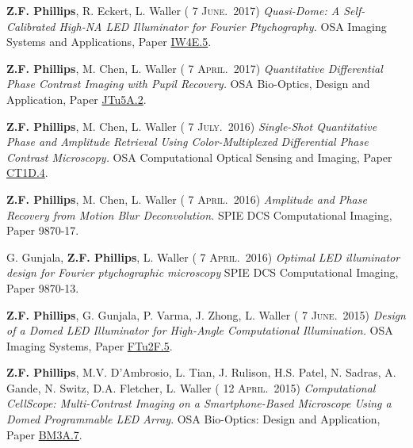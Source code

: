 \documentclass[12pt,letterpaper]{article}
\renewcommand{\date}[1]{{} #1}
\begin{document}
\textbf{Z.F. Phillips}, R. Eckert, L. Waller (\date{7 \textsc{June.}~2017})
\emph{Quasi-Dome: A Self-Calibrated High-NA LED  \linebreak Illuminator for Fourier Ptychography.} OSA Imaging Systems and Applications, Paper \href{https://www.osapublishing.org/abstract.cfm?uri=COSI-2016-CT1D.4}{IW4E.5}.
\medskip

\textbf{Z.F. Phillips}, M. Chen, L. Waller (\date{7 \textsc{April.}~2017})
\emph{Quantitative Differential Phase Contrast Imaging with Pupil Recovery.} OSA Bio-Optics, Design and Application, Paper \href{https://www.osapublishing.org/abstract.cfm?uri=BODA-2017-JTu5A.2}{JTu5A.2}.
\medskip

\textbf{Z.F. Phillips}, M. Chen, L. Waller (\date{7 \textsc{July.}~2016})
\emph{Single-Shot Quantitative Phase and Amplitude Retrieval Using Color-Multiplexed Differential Phase Contrast Microscopy.} OSA Computational Optical Sensing and Imaging, Paper \href{https://www.osapublishing.org/abstract.cfm?uri=COSI-2016-CT1D.4}{CT1D.4}.
\medskip

\textbf{Z.F. Phillips}, M. Chen, L. Waller (\date{7 \textsc{April.}~2016})
\emph{Amplitude and Phase Recovery from Motion Blur  \linebreak Deconvolution.} SPIE DCS Computational Imaging, Paper 9870-17.
\medskip

G. Gunjala, \textbf{Z.F. Phillips}, L. Waller (\date{7 \textsc{April.}~2016})
\emph{Optimal LED illuminator design for Fourier  \linebreak ptychographic microscopy} SPIE DCS Computational Imaging, Paper 9870-13.
\medskip

\textbf{Z.F. Phillips}, G. Gunjala, P. Varma, J. Zhong, L. Waller (\date{7 \textsc{June.}~2015})
\emph{Design of a Domed LED  \linebreak Illuminator for High-Angle Computational Illumination.} OSA Imaging Systems, Paper \href{https://www.osapublishing.org/abstract.cfm?uri=ISA-2015-ITh1A.2}{FTu2F.5}.
\medskip

\textbf{Z.F. Phillips}, M.V. D'Ambrosio, L. Tian, J. Rulison, H.S. Patel, N. Sadras, A. Gande, N. Switz,  \linebreak D.A. Fletcher, L. Waller (\date{12 \textsc{April.}~2015})
\emph{Computational CellScope: Multi-Contrast Imaging on a  \linebreak Smartphone-Based Microscope Using a Domed Programmable LED Array}. OSA Bio-Optics:  \linebreak Design and Application, Paper \href{https://www.osapublishing.org/abstract.cfm?uri=BODA-2015-BM3A.7}{BM3A.7}.
\medskip
\end{document}
